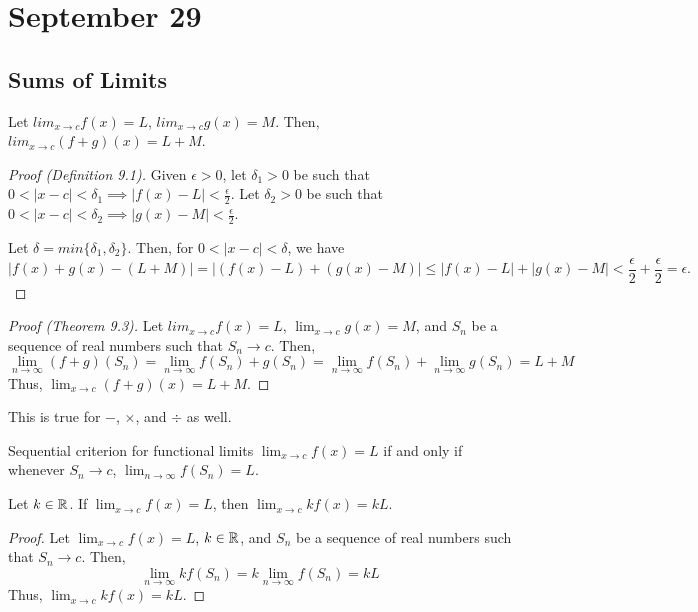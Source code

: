\chapter{September 29}

\section{Sums of Limits}
\begin{theorem}{}{}
    Let $lim_{x \to c} f(x) = L$, $lim_{x \to c} g(x) = M$. Then, $lim_{x \to c} (f + g)(x) = L + M$.
\end{theorem}
\begin{proof}[Proof (Definition 9.1)]
    Given $\epsilon > 0$, let $\delta_1 > 0$ be such that $0 < |x - c| < \delta_1 \implies |f(x) - L| < \frac{\epsilon}{2}$. Let $\delta_2 > 0$ be such that $0 < |x - c| < \delta_2 \implies |g(x) - M| < \frac{\epsilon}{2}$.

    Let $\delta = min\{\delta_1, \delta_2\}$. Then, for $0 < |x - c| < \delta$, we have $$|f(x) + g(x) - (L + M)| = |(f(x) - L) + (g(x) - M)| \leq |f(x) - L| + |g(x) - M| < \frac{\epsilon}{2} + \frac{\epsilon}{2} = \epsilon.$$
\end{proof}
\begin{proof}[Proof (Theorem 9.3)]
    Let $lim_{x \to c} f(x) = L$, $\lim_{x \to c} g(x) = M$, and $S_n$ be a sequence of real numbers such that $S_n \to c$. Then, $$\lim_{n \to \infty} (f + g)(S_n) = \lim_{n \to \infty} f(S_n) + g(S_n) = \lim_{n \to \infty} f(S_n) + \lim_{n \to \infty} g(S_n) = L + M$$ Thus, $\lim_{x \to c} (f + g)(x) = L + M$.
\end{proof}
\begin{note}
    This is true for $-$, $\times$, and $\div$ as well.
\end{note}

\begin{definition}{Sequential criterion for functional limits}{}
    $\lim_{x \to c} f(x) = L$ if and only if whenever $S_n \to c$, $\lim_{n \to \infty} f(S_n) = L$.
\end{definition}

\begin{theorem}{}{}
    Let $k \in \mathbb{R}$. If $\lim_{x \to c} f(x) = L$, then $\lim_{x \to c} kf(x) = kL$.
\end{theorem}
\begin{proof}
    Let $\lim_{x \to c} f(x) = L$, $k \in \mathbb{R}$, and $S_n$ be a sequence of real numbers such that $S_n \to c$. Then, $$\lim_{n \to \infty} kf(S_n) = k\lim_{n \to \infty} f(S_n) = kL$$ Thus, $\lim_{x \to c} kf(x) = kL$.
\end{proof}

